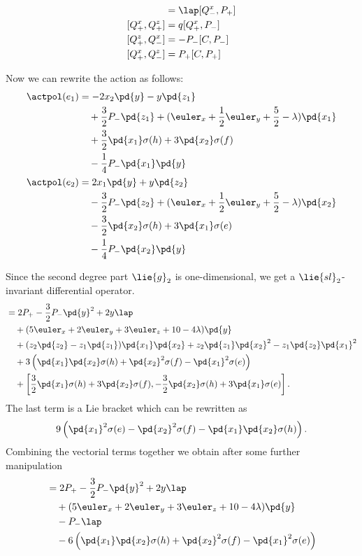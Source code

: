 \begin{align}
[Q_-^x, Q_-^z] & = \lap [Q_-^x, P_+] \\
[Q_+^x, Q_+^z] & = q [Q_+^x, P_-] \\
[Q_+^z, Q_-^x] & = -P_-[C, P_-] \\
[Q_+^x, Q_-^z] & = P_+[C, P_+]
\end{align}

Now we can rewrite the action as follows:
\begin{align}
    \actpol(e_1) &= -2 x_2 \pd{y} - y \pd{z_1} \\
             & \quad + \frac{3}{2} P_- \pd{z_1} + ( \euler_x + \frac{1}{2}\euler_y + \frac{5}{2} - \lambda)\pd{x_1} \\
             & \quad + \frac{3}{2} \pd{x_1}\sigma(h) + 3 \pd{x_2} \sigma(f) \\
             & \quad - \frac{1}{4} P_- \pd{x_1}\pd{y}\\
    \actpol(e_2) &= 2 x_1 \pd{y} + y \pd{z_2} \\
             & \quad - \frac{3}{2} P_- \pd{z_2} + ( \euler_x + \frac{1}{2}\euler_y + \frac{5}{2} - \lambda)\pd{x_2} \\
             & \quad - \frac{3}{2} \pd{x_2} \sigma(h) + 3 \pd{x_1} \sigma(e) \\
             & \quad - \frac{1}{4} P_- \pd{x_2}\pd{y}
\end{align}

Since the second degree part $\lie{g}_2$ is one-dimensional, we get a $\lie{sl}_2$-invariant differential operator.
\begin{align}
[\actpol(e_1), \actpol(e_2)] & = 2 P_+ - \frac{3}{2}P_-\pd{y}^2 + 2y\lap \\
& \quad + (5\euler_x + 2\euler_y + 3\euler_z + 10 - 4\lambda)\pd{y} \\
& \quad + (z_2\pd{z_2} - z_1\pd{z_1})\pd{x_1}\pd{x_2} + z_2\pd{z_1}\pd{x_2}^2 - z_1\pd{z_2}\pd{x_1}^2 \\
& \quad + 3\left(\pd{x_1}\pd{x_2}\sigma(h) + \pd{x_2}^2 \sigma(f) - \pd{x_1}^2 \sigma(e) \right) \\
& \quad + \left[\frac{3}{2} \pd{x_1}\sigma(h) + 3 \pd{x_2} \sigma(f), - \frac{3}{2} \pd{x_2} \sigma(h) + 3 \pd{x_1} \sigma(e) \right].
\end{align}
The last term is a Lie bracket which can be rewritten as
\begin{equation}
9\left(\pd{x_1}^2\sigma(e) - \pd{x_2}^2\sigma(f) - \pd{x_1}\pd{x_2}  \sigma(h) \right).
\end{equation}
Combining the vectorial terms together we obtain after some further manipulation
\begin{align}
[\actpol(e_1), \actpol(e_2)] & = 2 P_+ - \frac{3}{2}P_-\pd{y}^2 + 2y\lap \\
& \quad + (5\euler_x + 2\euler_y + 3\euler_z + 10 - 4\lambda)\pd{y} \\
& \quad - P_- \lap\\
& \quad - 6\left(\pd{x_1}\pd{x_2}\sigma(h) + \pd{x_2}^2 \sigma(f) - \pd{x_1}^2 \sigma(e) \right)
\end{align}

